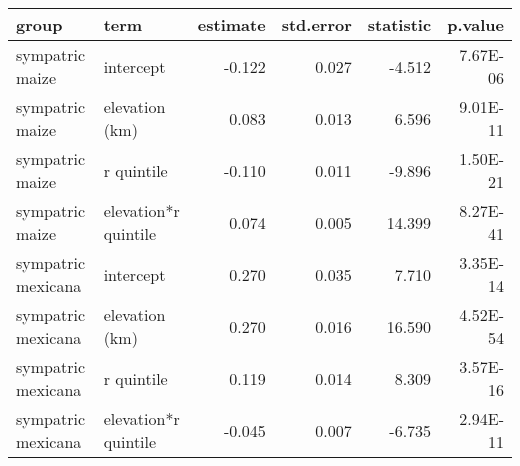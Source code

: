 \begin{table}[ht]
\centering
\begin{tabular}{llrrrr}
  \hline
group & term & estimate & std.error & statistic & p.value \\ 
  \hline
sympatric maize & intercept & -0.122 & 0.027 & -4.512 & 7.67E-06 \\ 
  sympatric maize & elevation (km) & 0.083 & 0.013 & 6.596 & 9.01E-11 \\ 
  sympatric maize & r quintile & -0.110 & 0.011 & -9.896 & 1.50E-21 \\ 
  sympatric maize & elevation*r quintile & 0.074 & 0.005 & 14.399 & 8.27E-41 \\ 
  sympatric mexicana & intercept & 0.270 & 0.035 & 7.710 & 3.35E-14 \\ 
  sympatric mexicana & elevation (km) & 0.270 & 0.016 & 16.590 & 4.52E-54 \\ 
  sympatric mexicana & r quintile & 0.119 & 0.014 & 8.309 & 3.57E-16 \\ 
  sympatric mexicana & elevation*r quintile & -0.045 & 0.007 & -6.735 & 2.94E-11 \\ 
   \hline
\end{tabular}
\end{table}
